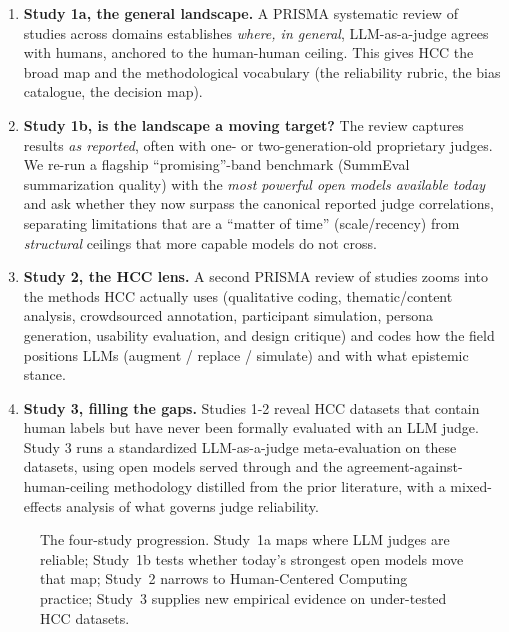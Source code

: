 \begin{enumerate}[leftmargin=1.5em,itemsep=2pt]
\item \textbf{Study 1a, the general landscape.} A PRISMA systematic review of \Nstudies{} studies across
\Ndomains{} domains establishes \emph{where, in general}, LLM-as-a-judge agrees with humans, anchored to the
human-human ceiling. This gives HCC the broad map and the methodological vocabulary (the reliability rubric, the
bias catalogue, the decision map).
\item \textbf{Study 1b, is the landscape a moving target?} The review captures results \emph{as reported}, often
with one- or two-generation-old proprietary judges. We re-run a flagship ``promising''-band benchmark (SummEval
summarization quality) with the \emph{most powerful open models available today} and ask whether they now surpass
the canonical reported judge correlations, separating limitations that are a ``matter of time'' (scale/recency)
from \emph{structural} ceilings that more capable models do not cross.
\item \textbf{Study 2, the HCC lens.} A second PRISMA review of \STN{} studies zooms into the methods HCC
actually uses (qualitative coding, thematic/content analysis, crowdsourced annotation, participant simulation,
persona generation, usability evaluation, and design critique) and codes how the field positions LLMs (augment /
replace / simulate) and with what epistemic stance.
\item \textbf{Study 3, filling the gaps.} Studies 1-2 reveal HCC datasets that contain human labels
but have never been formally evaluated with an LLM judge. Study 3 runs a standardized LLM-as-a-judge
meta-evaluation on these datasets, using open models served through \PROVIDER{} and the
agreement-against-human-ceiling methodology distilled from the prior literature, with a mixed-effects analysis of
what governs judge reliability.
\end{enumerate}

\begin{figure}[t]\centering
{}
\caption{The four-study progression. Study~1a maps where LLM judges are reliable; Study~1b tests whether today's
strongest open models move that map; Study~2 narrows to Human-Centered Computing practice; Study~3 supplies new
empirical evidence on under-tested HCC datasets.}
\label{fig:overview}
\end{figure}

